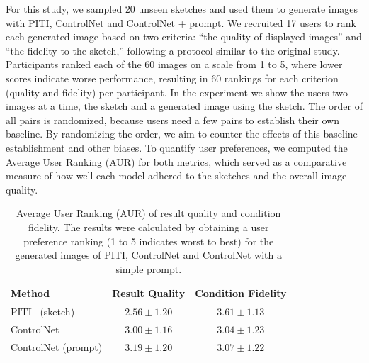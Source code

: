 For this study, we sampled 20 unseen sketches and used them to generate images with PITI, ControlNet and ControlNet + prompt. We recruited 17 users to rank each generated image based on two criteria: “the quality of displayed images” and “the fidelity to the sketch,” following a protocol similar to the original study. Participants ranked each of the 60 images on a scale from 1 to 5, where lower scores indicate worse performance, resulting in 60 rankings for each criterion (quality and fidelity) per participant. In the experiment we show the users two images at a time, the sketch and a generated image using the sketch. The order of all pairs is randomized, because users need a few pairs to establish their own baseline. By randomizing the order, we aim to counter the effects of this baseline establishment and other biases. To quantify user preferences, we computed the Average User Ranking (AUR) for both metrics, which served as a comparative measure of how well each model adhered to the sketches and the overall image quality.
\begin{table}[hbp]
    \begin{center}
        \caption{Average User Ranking (AUR) of result quality and
        condition fidelity. The results were calculated by obtaining a user preference ranking (1 to 5 indicates worst to best) for the generated images of PITI, ControlNet and ControlNet with a simple prompt.}
        \label{tab:controlnet:experiment}
        \def\arraystretch{1.1}
        \begin{tabular}{lcc}
            \toprule
            \textbf{Method}     & \textbf{Result Quality} & \textbf{Condition Fidelity}  \\
            \midrule
            PITI~\cite{wang2022pretrainingneedimagetoimagetranslation} (sketch)            & $2.56 \pm 1.20$         & $3.61 \pm 1.13$ \\
            ControlNet          & $3.00 \pm 1.16$         & $3.04 \pm 1.23$ \\
            ControlNet (prompt) & $3.19 \pm 1.20$         & $3.07 \pm 1.22$ \\
            \bottomrule
        \end{tabular}
    \end{center}
\end{table}


